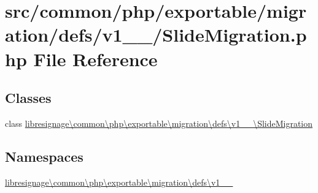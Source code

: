 \hypertarget{v1__1__0_2SlideMigration_8php}{}\section{src/common/php/exportable/migration/defs/v1\+\_\+\_/\+Slide\+Migration.php File Reference}
\label{v1__1__0_2SlideMigration_8php}
\subsection*{Classes}
\begin{DoxyCompactItemize}
\item 
class \hyperlink{classlibresignage_1_1common_1_1php_1_1exportable_1_1migration_1_1defs_1_1v1__1__0_1_1SlideMigration}{libresignage\textbackslash{}common\textbackslash{}php\textbackslash{}exportable\textbackslash{}migration\textbackslash{}defs\textbackslash{}v1\+\_\+\_\textbackslash{}\+Slide\+Migration}
\end{DoxyCompactItemize}
\subsection*{Namespaces}
\begin{DoxyCompactItemize}
\item 
 \hyperlink{namespacelibresignage_1_1common_1_1php_1_1exportable_1_1migration_1_1defs_1_1v1__1__0}{libresignage\textbackslash{}common\textbackslash{}php\textbackslash{}exportable\textbackslash{}migration\textbackslash{}defs\textbackslash{}v1\+\_\+\_}
\end{DoxyCompactItemize}
